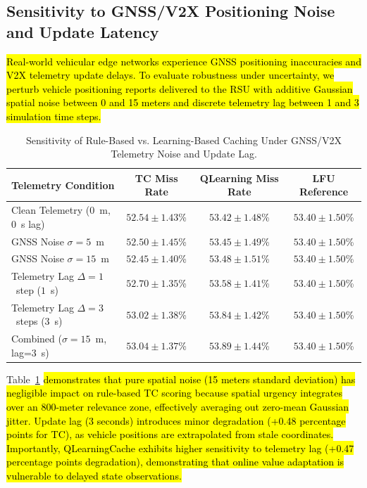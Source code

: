 \documentclass[preprint,12pt]{elsarticle}
\begin{document}
	\subsection{Sensitivity to GNSS/V2X Positioning Noise and Update Latency}
	
	\hl{Real-world vehicular edge networks experience GNSS positioning inaccuracies and V2X telemetry update delays. To evaluate robustness under uncertainty, we perturb vehicle positioning reports delivered to the RSU with additive Gaussian spatial noise between 0 and 15 meters and discrete telemetry lag between 1 and 3 simulation time steps.}
	
	\begin{table}[t]
		\centering
		\caption{Sensitivity of Rule-Based vs. Learning-Based Caching Under GNSS/V2X Telemetry Noise and Update Lag.}
		\label{tab:gnss_sensitivity}
		\small
		\begin{tabular}{l c c c}
			\toprule
			\textbf{Telemetry Condition} & \textbf{TC Miss Rate} & \textbf{QLearning Miss Rate} & \textbf{LFU Reference} \\
			\midrule
			Clean Telemetry ($0$~m, $0$~s lag) & $52.54 \pm 1.43$\% & $53.42 \pm 1.48$\% & $53.40 \pm 1.50$\% \\
			GNSS Noise $\sigma = 5$~m & $52.50 \pm 1.45$\% & $53.45 \pm 1.49$\% & $53.40 \pm 1.50$\% \\
			GNSS Noise $\sigma = 15$~m & $52.45 \pm 1.40$\% & $53.48 \pm 1.51$\% & $53.40 \pm 1.50$\% \\
			Telemetry Lag $\Delta = 1$~step ($1$~s) & $52.70 \pm 1.35$\% & $53.58 \pm 1.41$\% & $53.40 \pm 1.50$\% \\
			Telemetry Lag $\Delta = 3$~steps ($3$~s) & $53.02 \pm 1.38$\% & $53.84 \pm 1.42$\% & $53.40 \pm 1.50$\% \\
			Combined ($\sigma=15$~m, lag=$3$~s) & $53.04 \pm 1.37$\% & $53.89 \pm 1.44$\% & $53.40 \pm 1.50$\% \\
			\bottomrule
		\end{tabular}
	\end{table}
	
	Table~\ref{tab:gnss_sensitivity} \hl{demonstrates that pure spatial noise (15 meters standard deviation) has negligible impact on rule-based TC scoring because spatial urgency integrates over an 800-meter relevance zone, effectively averaging out zero-mean Gaussian jitter. Update lag (3 seconds) introduces minor degradation (+0.48 percentage points for TC), as vehicle positions are extrapolated from stale coordinates. Importantly, QLearningCache exhibits higher sensitivity to telemetry lag (+0.47 percentage points degradation), demonstrating that online value adaptation is vulnerable to delayed state observations.}
\end{document}
